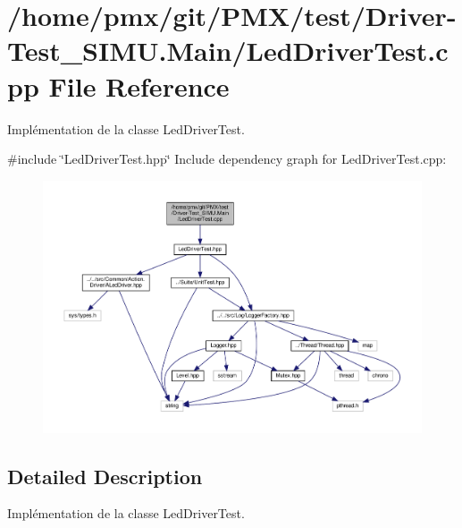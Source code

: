 \hypertarget{Driver-Test__SIMU_8Main_2LedDriverTest_8cpp}{}\section{/home/pmx/git/\+P\+M\+X/test/\+Driver-\/\+Test\+\_\+\+S\+I\+MU.Main/\+Led\+Driver\+Test.cpp File Reference}
\label{Driver-Test__SIMU_8Main_2LedDriverTest_8cpp}


Implémentation de la classe Led\+Driver\+Test.  


{\ttfamily \#include \char`\"{}Led\+Driver\+Test.\+hpp\char`\"{}}\newline
Include dependency graph for Led\+Driver\+Test.\+cpp\+:
\nopagebreak
\begin{figure}[H]
\begin{center}
\leavevmode
\includegraphics[width=350pt]{Driver-Test__SIMU_8Main_2LedDriverTest_8cpp__incl}
\end{center}
\end{figure}


\subsection{Detailed Description}
Implémentation de la classe Led\+Driver\+Test. 


